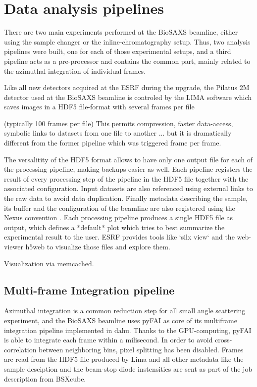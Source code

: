 \documentclass[preprint]{iucr}              %
\begin{document}
\section{Data analysis pipelines}

There are two main experiments performed at the BioSAXS beamline, either using the sample changer or the inline-chromatography setup.
Thus, two analysis pipelines were built, one for each of those experimental setups, and a third pipeline acts as a pre-processor and contains the common part, 
mainly related to the azimuthal integration of individual frames.

Like all new detectors acquired at the ESRF during the upgrade, the Pilatus 2M detector used at the BioSAXS beamline is controled by the LIMA \cite{lima} 
software which saves images in a HDF5 file-format \cite{hdf5} with several frames per file

 (typically 100 frames per file)
This permits compression, faster data-access, symbolic links to datasets from one file to another ... but it is dramatically different from the former pipeline which was triggered frame per frame.

The versalitity of the HDF5 format allows to have only one output file for each of the processing pipeline, making backups easier as well. 
Each pipeline registers the result of every processing step of the pipeline in the HDF5 file together with the associated configuration.
Input datasets are also referenced using external links to the raw data to avoid data duplication. 
Finally metadata describing the sample, its buffer and the configuration of the beamline are also registered using the Nexus convention \cite{nexus}.
Each processing pipeline produces a single HDF5 file as output, which defines a *default* plot which tries to best summarize the experimental result to the user.
ESRF provides tools like `silx view` \cite{silx}  and the web-viewer h5web \cite{silx} to visualize those files and explore them.

Visualization via memcached.

\subsection{Multi-frame Integration pipeline}

Azimuthal integration is a common reduction step for all small angle scattering experiment, and the BioSAXS beamline uses
pyFAI \cite{pyfai_2020} as core of its multiframe integration pipeline implemented in dahu.
Thanks to the GPU-computing, pyFAI is able to integrate each frame within a milisecond.
In order to avoid cross-correlation between neighboring bins, pixel splitting has been disabled.
Frames are read from the HDF5 file produced by Lima \cite{lima} and all other metadata like the sample desciption and the beam-stop diode instensities
are sent as part of the job description from BSXcube.  
\end{document}
